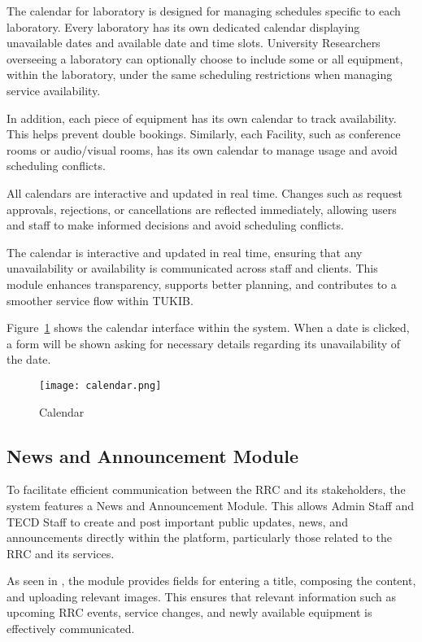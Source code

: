The calendar for laboratory is designed for managing schedules specific to each laboratory. Every laboratory has its own dedicated calendar displaying unavailable dates and available date and time slots. University Researchers overseeing a laboratory can optionally choose to include some or all equipment, within the laboratory, under the same scheduling restrictions when managing service availability.

In addition, each piece of equipment has its own calendar to track availability. This helps prevent double bookings. Similarly, each Facility, such as conference rooms or audio/visual rooms, has its own calendar to manage usage and avoid scheduling conflicts.

All calendars are interactive and updated in real time. Changes such as request approvals, rejections, or cancellations are reflected immediately, allowing users and staff to make informed decisions and avoid scheduling conflicts.

The calendar is interactive and updated in real time, ensuring that any unavailability or availability is communicated across staff and clients. This module enhances transparency, supports better planning, and contributes to a smoother service flow within TUKIB.

Figure~\ref{fig:calendar} shows the calendar interface within the system. When a date is clicked, a form will be shown asking for necessary details regarding its unavailability of the date.

\begin{figure}[h]
    \centering
    \texttt{[image: calendar.png]}
    \caption{Calendar}
    \label{fig:calendar}
\end{figure}

\newpage

\subsection{News and Announcement Module}

To facilitate efficient communication between the RRC and its stakeholders, the system features a News and Announcement Module. This allows Admin Staff and TECD Staff to create and post important public updates, news, and announcements directly within the platform, particularly those related to the RRC and its services.

As seen in , the module provides fields for entering a title, composing the content, and uploading relevant images. This ensures that relevant information such as upcoming RRC events, service changes, and newly available equipment is effectively communicated.

